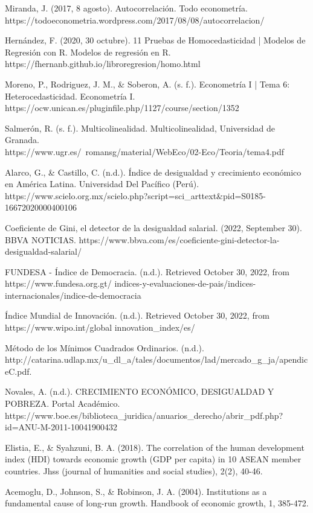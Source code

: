 \documentclass[11pt]{article}
\begin{document}
{Miranda, J. (2017, 8 agosto). Autocorrelación. Todo econometría. \\
https://todoeconometria.wordpress.com/2017/08/08/autocorrelacion/

Hernández, F. (2020, 30 octubre). 11 Pruebas de Homocedasticidad | Modelos de Regresión con R. Modelos de regresión en R. https://fhernanb.github.io/libroregresion/homo.html

Moreno, P., Rodriguez, J. M., & Soberon, A. (s. f.). Econometría I | Tema 6: Heterocedasticidad. Econometría I. \\ https://ocw.unican.es/pluginfile.php/1127/course/section/1352

Salmerón, R. (s. f.). Multicolinealidad. Multicolinealidad, Universidad de Granada.\\ https://www.ugr.es/~romansg/material/WebEco/02-Eco/Teoria/tema4.pdf

 Alarco, G., & Castillo, C. (n.d.). Índice de desigualdad y crecimiento económico en América Latina. Universidad Del Pacífico (Perú). https://www.scielo.org.mx/scielo.php?script=sci_arttext&pid=S0185-16672020000400106
 
 Coeficiente de Gini, el detector de la desigualdad salarial. (2022, September 30). BBVA NOTICIAS. https://www.bbva.com/es/coeficiente-gini-detector-la-desigualdad-salarial/
 
 FUNDESA - Índice de Democracia. (n.d.). Retrieved October 30, 2022, from https://www.fundesa.org.gt/
 indices-y-evaluaciones-de-pais/indices-internacionales/indice-de-democracia
 
 Índice Mundial de Innovación. (n.d.). Retrieved October 30, 2022, from https://www.wipo.int/global
 innovation_index/es/
 
 Método de los Mínimos Cuadrados Ordinarios. (n.d.). http://catarina.udlap.mx/u_dl_a/tales/documentos/lad/mercado_g_ja/apendiceC.pdf.
 
 Novales, A. (n.d.). CRECIMIENTO ECONÓMICO, DESIGUALDAD Y POBREZA. Portal Académico. https://www.boe.es/biblioteca_juridica/anuarios_derecho/abrir_pdf.php?id=ANU-M-2011-10041900432

Elistia, E., & Syahzuni, B. A. (2018). The correlation of the human development index (HDI) towards economic growth (GDP per capita) in 10 ASEAN member countries. Jhss (journal of humanities and social studies), 2(2), 40-46.

Acemoglu, D., Johnson, S., & Robinson, J. A. (2004). Institutions as a fundamental cause of long-run growth. Handbook of economic growth, 1, 385-472.

}
\end{document}
